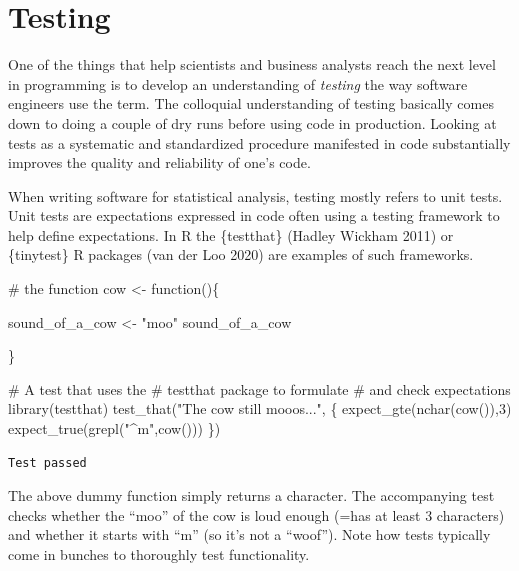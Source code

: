 \documentclass[
  12pt,
  letterpaper,
]{krantz}
\newenvironment{Shaded}{\begin{snugshade}}{\end{snugshade}}
\newcommand{\CommentTok}[1]{\textcolor[rgb]{0.37,0.37,0.37}{#1}}
\newcommand{\ControlFlowTok}[1]{\textcolor[rgb]{0.00,0.23,0.31}{#1}}
\newcommand{\DecValTok}[1]{\textcolor[rgb]{0.68,0.00,0.00}{#1}}
\newcommand{\FunctionTok}[1]{\textcolor[rgb]{0.28,0.35,0.67}{#1}}
\newcommand{\NormalTok}[1]{\textcolor[rgb]{0.00,0.23,0.31}{#1}}
\newcommand{\OtherTok}[1]{\textcolor[rgb]{0.00,0.23,0.31}{#1}}
\newcommand{\StringTok}[1]{\textcolor[rgb]{0.13,0.47,0.30}{#1}}
\begin{document}
\hypertarget{testing}{%
\section{Testing}\label{testing}}

One of the things that help scientists and business analysts reach the
next level in programming is to develop an understanding of
\emph{testing} the way software engineers use the term. The colloquial
understanding of testing basically comes down to doing a couple of dry
runs before using code in production. Looking at tests as a systematic
and standardized procedure manifested in code substantially improves the
quality and reliability of one's code.

When writing software for statistical analysis, testing mostly refers to
unit tests. Unit tests are expectations expressed in code often using a
testing framework to help define expectations. In R the \{testthat\}
(Hadley Wickham 2011) or \{tinytest\} R packages (van der Loo 2020) are
examples of such frameworks.

\begin{Shaded}
\begin{Highlighting}[]
\CommentTok{\# the function}
\NormalTok{cow }\OtherTok{\textless{}{-}} \ControlFlowTok{function}\NormalTok{()\{}
  
\NormalTok{  sound\_of\_a\_cow }\OtherTok{\textless{}{-}} \StringTok{"moo"}
\NormalTok{  sound\_of\_a\_cow}
  
\NormalTok{\}}

\CommentTok{\# A test that uses the }
\CommentTok{\# testthat package to formulate }
\CommentTok{\# and check expectations}
\FunctionTok{library}\NormalTok{(testthat)}
\FunctionTok{test\_that}\NormalTok{(}\StringTok{"The cow still mooos..."}\NormalTok{, \{}
  \FunctionTok{expect\_gte}\NormalTok{(}\FunctionTok{nchar}\NormalTok{(}\FunctionTok{cow}\NormalTok{()),}\DecValTok{3}\NormalTok{)}
  \FunctionTok{expect\_true}\NormalTok{(}\FunctionTok{grepl}\NormalTok{(}\StringTok{"\^{}m"}\NormalTok{,}\FunctionTok{cow}\NormalTok{()))}
\NormalTok{\})}
\end{Highlighting}
\end{Shaded}

\begin{verbatim}
Test passed 
\end{verbatim}

The above dummy function simply returns a character. The accompanying
test checks whether the ``moo'' of the cow is loud enough (=has at least
3 characters) and whether it starts with ``m'' (so it's not a ``woof'').
Note how tests typically come in bunches to thoroughly test
functionality.
\end{document}
